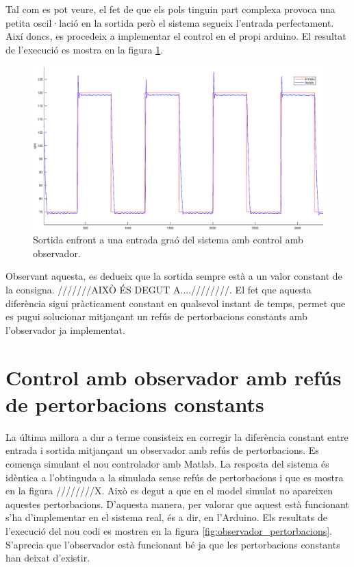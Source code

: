\documentclass[]{article}
\begin{document}
Tal com es pot veure, el fet de que els pols tinguin part complexa provoca una petita oscil·lació en la sortida però el sistema segueix l'entrada perfectament. Així doncs, es procedeix a implementar el control en el propi arduino. El resultat de l'execució es mostra en la figura \ref{fig:observador}.

\begin{figure}[H]
\centering
	\includegraphics[width = .8\linewidth]{images/Entrada_Sortida_Observador.eps}
	\caption{Sortida enfront a una entrada graó del sistema amb control amb observador.}
	\label{fig:observador}
\end{figure}

Observant aquesta, es dedueix que la sortida sempre està a un valor constant de la consigna. ///////AIXÒ ÉS DEGUT A....////////. El fet que aquesta diferència sigui pràcticament constant en qualsevol instant de temps, permet que es pugui solucionar mitjançant un refús de pertorbacions constants amb l'observador ja implementat. 

\section{Control amb observador amb refús de pertorbacions constants}

La última millora a dur a terme consisteix en corregir la diferència constant entre entrada i sortida mitjançant un observador amb refús de pertorbacions. Es comença simulant el nou controlador amb Matlab. La resposta del sistema és idèntica a l'obtinguda a la simulada sense refús de pertorbacions i que es mostra en la figura ////////X. Això es degut a que en el model simulat no apareixen aquestes pertorbacions. D'aquesta manera, per valorar que aquest està funcionant s'ha d'implementar en el sistema real, és a dir, en l'Arduino. Els resultats de l'execució del nou codi es mostren en la figura \ref{fig:observador_pertorbacions}. S'aprecia que l'observador està funcionant bé ja que les pertorbacions constants han deixat d'existir. 
\end{document}
